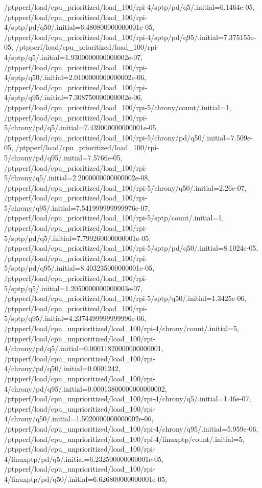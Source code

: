 {    /ptpperf/load/cpu_prioritized/load_100/rpi-4/sptp/pd/q5/.initial=6.1464e-05,
    /ptpperf/load/cpu_prioritized/load_100/rpi-4/sptp/pd/q50/.initial=6.480800000000001e-05,
    /ptpperf/load/cpu_prioritized/load_100/rpi-4/sptp/pd/q95/.initial=7.375155e-05,
    /ptpperf/load/cpu_prioritized/load_100/rpi-4/sptp/q5/.initial=1.9300000000000002e-07,
    /ptpperf/load/cpu_prioritized/load_100/rpi-4/sptp/q50/.initial=2.0100000000000002e-06,
    /ptpperf/load/cpu_prioritized/load_100/rpi-4/sptp/q95/.initial=7.308750000000002e-06,
    /ptpperf/load/cpu_prioritized/load_100/rpi-5/chrony/count/.initial=1,
    /ptpperf/load/cpu_prioritized/load_100/rpi-5/chrony/pd/q5/.initial=7.439000000000001e-05,
    /ptpperf/load/cpu_prioritized/load_100/rpi-5/chrony/pd/q50/.initial=7.509e-05,
    /ptpperf/load/cpu_prioritized/load_100/rpi-5/chrony/pd/q95/.initial=7.5766e-05,
    /ptpperf/load/cpu_prioritized/load_100/rpi-5/chrony/q5/.initial=2.2000000000000002e-08,
    /ptpperf/load/cpu_prioritized/load_100/rpi-5/chrony/q50/.initial=2.26e-07,
    /ptpperf/load/cpu_prioritized/load_100/rpi-5/chrony/q95/.initial=7.541999999999976e-07,
    /ptpperf/load/cpu_prioritized/load_100/rpi-5/sptp/count/.initial=1,
    /ptpperf/load/cpu_prioritized/load_100/rpi-5/sptp/pd/q5/.initial=7.799260000000001e-05,
    /ptpperf/load/cpu_prioritized/load_100/rpi-5/sptp/pd/q50/.initial=8.1024e-05,
    /ptpperf/load/cpu_prioritized/load_100/rpi-5/sptp/pd/q95/.initial=8.403235000000001e-05,
    /ptpperf/load/cpu_prioritized/load_100/rpi-5/sptp/q5/.initial=1.2050000000000003e-07,
    /ptpperf/load/cpu_prioritized/load_100/rpi-5/sptp/q50/.initial=1.3425e-06,
    /ptpperf/load/cpu_prioritized/load_100/rpi-5/sptp/q95/.initial=4.2374499999999996e-06,
    /ptpperf/load/cpu_unprioritized/load_100/rpi-4/chrony/count/.initial=5,
    /ptpperf/load/cpu_unprioritized/load_100/rpi-4/chrony/pd/q5/.initial=0.00011820000000000001,
    /ptpperf/load/cpu_unprioritized/load_100/rpi-4/chrony/pd/q50/.initial=0.0001242,
    /ptpperf/load/cpu_unprioritized/load_100/rpi-4/chrony/pd/q95/.initial=0.00013800000000000002,
    /ptpperf/load/cpu_unprioritized/load_100/rpi-4/chrony/q5/.initial=1.46e-07,
    /ptpperf/load/cpu_unprioritized/load_100/rpi-4/chrony/q50/.initial=1.5020000000000002e-06,
    /ptpperf/load/cpu_unprioritized/load_100/rpi-4/chrony/q95/.initial=5.959e-06,
    /ptpperf/load/cpu_unprioritized/load_100/rpi-4/linuxptp/count/.initial=5,
    /ptpperf/load/cpu_unprioritized/load_100/rpi-4/linuxptp/pd/q5/.initial=6.232500000000001e-05,
    /ptpperf/load/cpu_unprioritized/load_100/rpi-4/linuxptp/pd/q50/.initial=6.626800000000001e-05,
}
